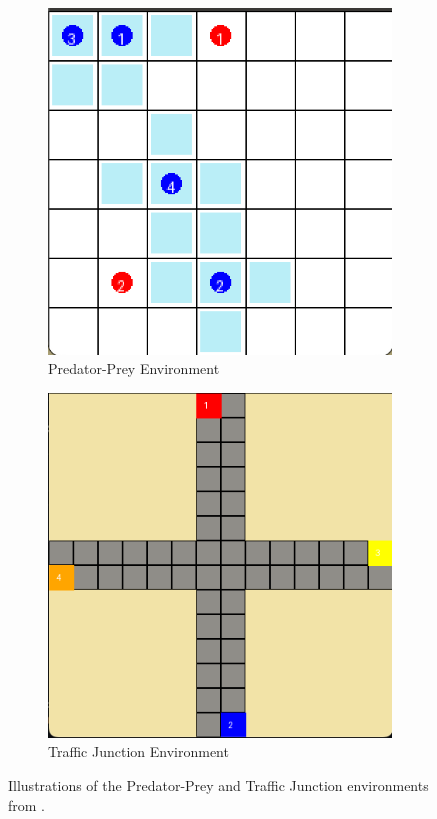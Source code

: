 \documentclass{article}
\begin{document}
\begin{figure}[h]
    \centering
    \begin{subfigure}[b]{0.4\textwidth}
        \centering
        \includegraphics[width=\textwidth]{images/predetorprey}
        \caption{Predator-Prey Environment}
        \label{fig:predator_prey}
    \end{subfigure}
    \hfill
    \begin{subfigure}[b]{0.4\textwidth}
        \centering
        \includegraphics[width=\textwidth]{images/traffic_junction}
        \caption{Traffic Junction Environment}
        \label{fig:traffic_junction}
    \end{subfigure}
    \caption{Illustrations of the Predator-Prey and Traffic Junction environments from \citep{magym2019github}.}
    \label{fig:environments}
\end{figure}
\end{document}
